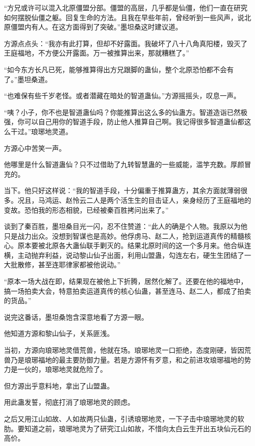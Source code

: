 \begin{this_body}
“方兄或许可以混入北原僵盟分部。僵盟的高层，几乎都是仙僵，他们一直在研究如何摆脱仙僵之躯。回复生命的方法。且我在早些年前，曾经听到一些风声，说北原僵盟内有人。在这方面得到了突破。”墨坦桑这时建议道。

方源点点头：“我亦有此打算，但却不好露面。我破坏了八十八角真阳楼，毁灭了王庭福地，不方便公开露面。万一被推算出来，那就糟糕了。”

“如今东方长凡已死，能够推算得出方兄跟脚的蛊仙，整个北原恐怕都不会有了。”墨坦桑道。

“也难保有些千岁老怪。或者潜藏在暗处的智道蛊仙。”方源摇摇头，叹息一声。

“咦？小子，你不也是智道蛊仙吗？你能推算出这么多的仙蛊方。智道造诣已然极强，你可以自己用你的智道手段，防止他人推算自己啊。我记得很多智道蛊仙都这么干过。”琅琊地灵道。

方源心中苦笑一声。

他哪里是什么智道蛊仙？只不过借助了九转智慧蛊的一些威能，滥竽充数。厚颜冒充的。

当下。他只好这样说：“我的智道手段，十分偏重于推算蛊方，其余方面就薄弱很多。况且，马鸿运、赵怜云二人是两个活生生的目击证人，亲身经历了王庭福地的变故。恐怕我的形态相貌，已经被秦百胜拷问出来了。”

谈到了秦百胜，墨坦桑目光一闪，忍不住赞道：“此人的确是个人物。我原以为他只是战力出众。没想到智谋也是高妙。他俘虏马、赵二人，抢到运道真传的精髓核心。原本要被北原各大蛊仙联手剿灭的。结果北原时间的这一个多月来。他合纵连横，主动抛弃利益，说动黎山仙子出面，利用山盟蛊，勾连左右，硬生生团结了一大批散修，甚至连耶律家都被他说动。”

“原本一场大战在即，结果现在被他上下折腾，居然化解了。还要在他的福地中，搞一场拍卖大会，特意拍卖运道真传的核心仙蛊，甚至连马、赵二人，都成了拍卖的货品。”

说完这番话，墨坦桑饱含深意地看了方源一眼。

他知道方源和黎山仙子，关系匪浅。

当初，方源向琅琊地灵借荒兽，他就在场。琅琊地灵一口拒绝，态度刚硬，皆因荒兽乃是琅琊福地的最主要防御力量。若是方源怀有歹意，和之前进攻琅琊福地的势力是一伙的，琅琊地灵就危险了。

但方源出乎意料地，拿出了山盟蛊。

用此蛊发誓，彻底打消了琅琊地灵的顾虑。

之后又用江山如故、人如故两只仙蛊，引诱琅琊地灵，一下子击中琅琊地灵的软肋。要知道之前，琅琊地灵为了研究江山如故，不惜向太白云生开出五块仙元石的高价。


\end{this_body}
